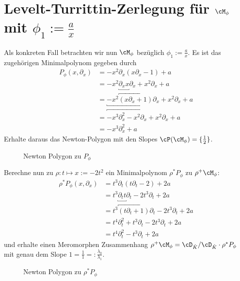 \section{Levelt-Turrittin-Zerlegung für $\cM_{\phi}$ mit
  $\phi_1:=\frac{a}{x}$}
Als konkreten Fall betrachten wir nun $\cM_{\phi}$ bezüglich
$\phi_1:=\frac{a}{x}$. Es ist das zugehörigen Minimalpolynom gegeben durch
\begin{align*}
P_{\phi}(x,\partial_x) &=-x^2\partial_x (x\partial_x-1)+a
\\&=-x^2\underbracket{\partial_xx}\partial_x+x^2\partial_x+a
\\&=\underbracket{-x^2\overbracket{(x\partial_x+1)}\partial_x} + x^2\partial_x
  + a
\\&=\overbracket{-x^3\partial_x^2 - x^2\partial_x}+x^2\partial_x+a
\\&=-x^3\partial_x^2+a
\end{align*}
Erhalte daraus das Newton-Polygon mit den Slopes
$\cP(\cM_{\phi})=\{\frac{1}{2}\}$.
\begin{figure}[H] %
\begin{center}
\end{center}
\caption{Newton Polygon zu $P_{\phi}$}
\end{figure}
Berechne nun zu $\rho:t\mapsto x:=-2t^2$ ein Minimalpolynom $\rho^*P_{\phi}$
zu $\rho^+\cM_{\phi}$:
\begin{align*}
\rho^*P_{\phi}(x,\partial_x)
  &=t^{3}\partial_t(t\partial_t-2)+2a\\
  &=t^{3}\underbracket{\partial_tt}\partial_t-2t^{3}\partial_t+2a\\
  &=t^{3}\overbracket{(t\partial_t+1)}\partial_t-2t^{3}\partial_t+2a\\
  &=t^{4}\partial_t^2+t^{3}\partial_t-2t^{3}\partial_t+2a\\
  &=t^{4}\partial_t^2-t^{3}\partial_t+2a
\end{align*}
und erhalte einen Meromorphen Zusammenhang $\rho^+\cM_{\phi}=\cD_{\hat
K}/\cD_{\hat K}\cdot\rho^*P_{\phi}$ mit genau dem Slope
$1=\frac{1}{1}=:\frac{\lambda_0}{\lambda_1}$.
\begin{figure}[H]
\begin{center}
\end{center}
\caption{Newton Polygon zu $\rho^*P_{\phi}$}
\end{figure}

